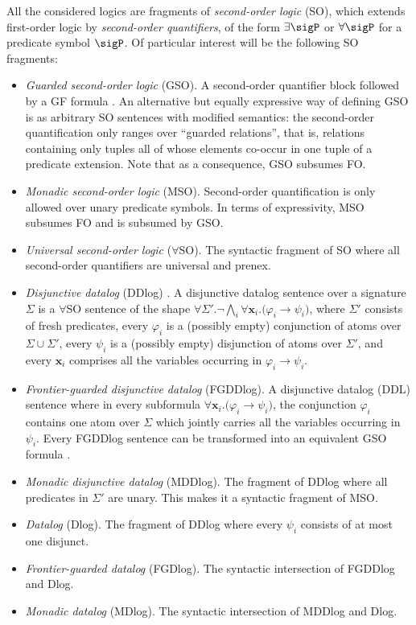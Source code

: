 \documentclass[10pt,a4paper]{amsart}
\theoremstyle{definition}
\numberwithin{equation}{section}
\theoremstyle{plain}
\theoremstyle{definition}
\theoremstyle{myexample}
\theoremstyle{plain}
\theoremstyle{definition}
\renewcommand{\vec}[1]{\boldsymbol{#1}}
\begin{document}
\noindent All the considered logics are fragments of \emph{second-order logic} (SO), which extends first-order logic by \emph{second-order quantifiers}, of the form $\exists \sigP$ or $\forall \sigP$ for a predicate symbol $\sigP$. 
Of particular interest will be the following SO fragments:
\begin{itemize}
	\item 
	\emph{Guarded second-order logic} (GSO). A second-order quantifier block followed by a GF formula \cite{GradelHO00}. An alternative but equally expressive way of defining GSO is as arbitrary SO sentences with modified semantics: the second-order quantification only ranges over ``guarded relations'', that is, relations containing only tuples all of whose elements co-occur in one tuple of a predicate extension. Note that as a consequence, GSO subsumes FO.
	\item 
    \emph{Monadic second-order logic} (MSO). Second-order quantification is only allowed over unary predicate symbols. In terms of expressivity, MSO subsumes FO and is subsumed by GSO.
	\item 
	\emph{Universal second-order logic} ($\forall$SO). The syntactic fragment of SO where all second-order quantifiers are universal and prenex.
	\item 
    \emph{Disjunctive datalog} (DDlog) \cite{EiterGM97}. 
    A disjunctive datalog sentence over a signature $\Sigma$ is a $\forall$SO sentence of the shape 
    $\forall \Sigma'.\neg\bigwedge_i \forall \vec{x}_i. \big(\varphi_i \to \psi_i \big)$, %
    where $\Sigma'$ consists of fresh predicates, every $\varphi_i$ is a (possibly empty) conjunction of atoms over $\Sigma \cup \Sigma'$, every $\psi_i$ is a (possibly empty) disjunction of atoms over $\Sigma'$, and every $\vec{x}_i$ comprises all the variables occurring in $\varphi_i \to \psi_i$.
	\item 
    \emph{Frontier-guarded disjunctive datalog} (FGDDlog). 
    A disjunctive datalog (DDL) sentence where in every subformula $\forall \vec{x}_i. \big(\varphi_i \to \psi_i\big)$, the conjunction $\varphi_i$ contains one atom over $\Sigma$ which jointly carries all the variables occurring in $\psi_i$. Every FGDDlog sentence can be transformed into an equivalent GSO formula \cite{GradelHO00}.
    \item 
    \emph{Monadic disjunctive datalog} (MDDlog). The fragment of DDlog where all predicates in $\Sigma'$ are unary. This makes it a syntactic fragment of MSO. 
    \item 
    \emph{Datalog} (Dlog). The fragment of DDlog where every $\psi_i$ consists of at most one disjunct.
	\item 
    \emph{Frontier-guarded datalog} (FGDlog). The syntactic intersection of FGDDlog and Dlog. 
    \item 
    \emph{Monadic datalog} (MDlog). The syntactic intersection of MDDlog and Dlog.

\end{itemize}
\end{document}
